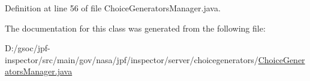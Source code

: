 Definition at line 56 of file Choice\+Generators\+Manager.\+java.



The documentation for this class was generated from the following file\+:\begin{DoxyCompactItemize}
\item 
D\+:/gsoc/jpf-\/inspector/src/main/gov/nasa/jpf/inspector/server/choicegenerators/\hyperlink{_choice_generators_manager_8java}{Choice\+Generators\+Manager.\+java}\end{DoxyCompactItemize}
